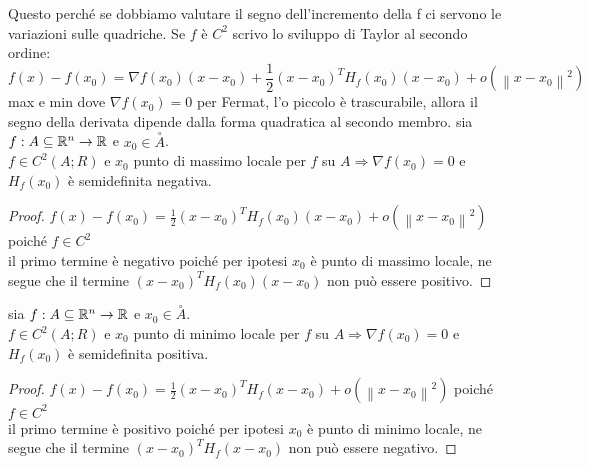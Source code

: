 Questo perché se dobbiamo valutare il segno dell'incremento della f ci servono le variazioni sulle quadriche. Se $f$ è $C^2$ scrivo lo sviluppo di Taylor al secondo ordine:\\
$$f(x)-f(x_0)=\nabla f(x_0)(x-x_0)+\frac{1}{2}(x-x_0)^TH_f(x_0)(x-x_0)+o(\left\|x-x_0\right\|^2)$$
max e min dove $\nabla f(x_0)=0$ per Fermat, l'o piccolo è trascurabile, allora il segno della derivata dipende dalla forma quadratica al secondo membro.
\proposition
sia $f:A\subseteq \mathbb{R}^n\rightarrow \mathbb{R}$ e $x_0\in\overset{\circ}{A}$.\\
$f\in C^2(A;R)$ e $x_0$ punto di massimo locale per $f$ su $A\Rightarrow\nabla f(x_0)=0$ e $H_f(x_0)$ è semidefinita negativa.
\begin{proof}
	$f(x)-f(x_0)=\frac{1}{2}(x-x_0)^TH_f(x_0)(x-x_0)+o(\left\|x-x_0\right\|^2)$ poiché $f\in C^2$\\
	il primo termine è negativo poiché per ipotesi $x_0$ è punto di massimo locale, ne segue che il termine $(x-x_0)^TH_f(x_0)(x-x_0)$ non può essere positivo. 
\end{proof} 
\proposition
sia $f:A\subseteq \mathbb{R}^n\rightarrow \mathbb{R}$ e $x_0\in\overset{\circ}{A}$.\\
$f\in C^2(A;R)$ e $x_0$ punto di minimo locale per $f$ su $A\Rightarrow\nabla f(x_0)=0$ e $H_f(x_0)$ è semidefinita positiva.
\begin{proof}
	$f(x)-f(x_0)=\frac{1}{2}(x-x_0)^TH_f(x-x_0)+o(\left\|x-x_0\right\|^2)$ poiché $f\in C^2$\\
	il primo termine è positivo poiché per ipotesi $x_0$ è punto di minimo locale, ne segue che il termine $(x-x_0)^TH_f(x-x_0)$ non può essere negativo. 
\end{proof} 


